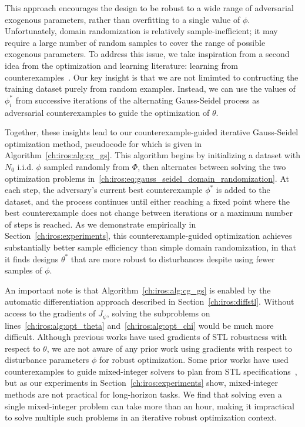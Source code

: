 This approach encourages the design to be robust to a wide range of adversarial exogenous parameters, rather than overfitting to a single value of $\phi$. Unfortunately, domain randomization is relatively sample-inefficient; it may require a large number of random samples to cover the range of possible exogenous parameters. To address this issue, we take inspiration from a second idea from the optimization and learning literature: learning from counterexamples~\cite{changNeuralLyapunovControl2019}. Our key insight is that we are not limimted to contructing the training dataset purely from random examples. Instead, we can use the values of $\phi^*_i$ from successive iterations of the alternating Gauss-Seidel process as adversarial counterexamples to guide the optimization of $\theta$.

Together, these insights lead to our counterexample-guided iterative Gauss-Seidel optimization method, pseudocode for which is given in Algorithm~\ref{ch:iros:alg:cg_gs}. This algorithm begins by initializing a dataset with $N_0$ i.i.d. $\phi$ sampled randomly from $\Phi$, then alternates between solving the two optimization problems in~\eqref{ch:iros:eq:gauss_seidel_domain_randomization}. At each step, the adversary's current best counterexample $\phi^*$ is added to the dataset, and the process continues until either reaching a fixed point where the best counterexample does not change between iterations or a maximum number of steps is reached. As we demonstrate empirically in Section~\ref{ch:iros:experiments}, this counterexample-guided optimization achieves substantially better sample efficiency than simple domain randomization, in that it finds designs $\theta^*$ that are more robust to disturbances despite using fewer samples of $\phi$.

An important note is that Algorithm~\ref{ch:iros:alg:cg_gs} is enabled by the automatic differentiation approach described in Section~\ref{ch:iros:diffstl}. Without access to the gradients of $J_\psi$, solving the subproblems on lines~\ref{ch:iros:alg:opt_theta} and~\ref{ch:iros:alg:opt_chi} would be much more difficult. Although previous works have used gradients of STL robustness with respect to $\theta$, we are not aware of any prior work using gradients with respect to disturbance parameters $\phi$ for robust optimization. Some prior works have used counterexamples to guide mixed-integer solvers to plan from STL specifications~\cite{raman15}, but as our experiments in Section~\ref{ch:iros:experiments} show, mixed-integer methods are not practical for long-horizon tasks. We find that solving even a single mixed-integer problem can take more than an hour, making it impractical to solve multiple such problems in an iterative robust optimization context.

